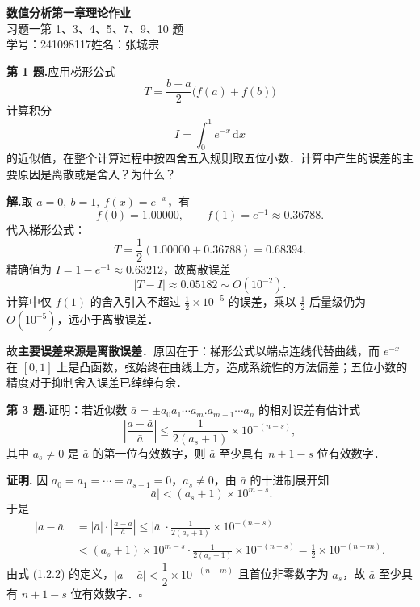\documentclass[UTF8,a4paper,11pt]{ctexart}
\newcommand*{\QED}{\hfill\ensuremath{\square}}
\begin{document}
\begin{center}
  {\LARGE\bfseries 数值分析\quad 第一章理论作业}\\[6pt]
  {\large 习题一\quad 第 1、3、4、5、7、9、10 题}\\[4pt]
  {\normalsize 学号：241098117\quad 姓名：张城宗}
\end{center}

\bigskip

\noindent\textbf{第 1 题.}\quad 应用梯形公式
\[
  T = \frac{b-a}{2}\bigl(f(a)+f(b)\bigr)
\]
计算积分
\[
  I = \int_0^1 e^{-x}\,\mathrm{d}x
\]
的近似值，在整个计算过程中按四舍五入规则取五位小数．计算中产生的误差的主要原因是离散或是舍入？为什么？

\medskip
\noindent\textbf{解.}\quad 取 $a=0,\ b=1,\ f(x)=e^{-x}$，有
\[
  f(0) = 1.00000,\qquad f(1) = e^{-1} \approx 0.36788.
\]
代入梯形公式：
\[
  T = \frac{1}{2}(1.00000 + 0.36788) = 0.68394.
\]
精确值为 $I = 1 - e^{-1} \approx 0.63212$，故离散误差
\[
  |T - I| \approx 0.05182 \sim O(10^{-2}).
\]
计算中仅 $f(1)$ 的舍入引入不超过 $\frac{1}{2}\times 10^{-5}$ 的误差，乘以 $\frac{1}{2}$ 后量级仍为
$O(10^{-5})$，远小于离散误差．

故\textbf{主要误差来源是离散误差}．原因在于：梯形公式以端点连线代替曲线，而
$e^{-x}$ 在 $[0,1]$ 上是凸函数，弦始终在曲线上方，造成系统性的方法偏差；五位小数的精度对于抑制舍入误差已绰绰有余．

\bigskip\bigskip

\noindent\textbf{第 3 题.}\quad 证明：若近似数
$\bar{a} = \pm a_0 a_1\cdots a_m.a_{m+1}\cdots a_n$
的相对误差有估计式
\[
  \left|\frac{a-\bar{a}}{\bar{a}}\right| \leqslant \frac{1}{2(a_s+1)}\times 10^{-(n-s)},
\]
其中 $a_s\neq 0$ 是 $\bar{a}$ 的第一位有效数字，则 $\bar{a}$ 至少具有 $n+1-s$ 位有效数字．

\medskip
\noindent\textbf{证明.}\quad
因 $a_0=a_1=\cdots=a_{s-1}=0$，$a_s\neq 0$，由 $\bar{a}$ 的十进制展开知
\[
  |\bar{a}| < (a_s+1)\times 10^{m-s}.
\]
于是
\begin{align*}
  |a-\bar{a}|
  &= |\bar{a}|\cdot\left|\frac{a-\bar{a}}{\bar{a}}\right|
   \leqslant |\bar{a}|\cdot\frac{1}{2(a_s+1)}\times 10^{-(n-s)}\\
  &< (a_s+1)\times 10^{m-s}\cdot\frac{1}{2(a_s+1)}\times 10^{-(n-s)}
   = \frac{1}{2}\times 10^{-(n-m)}.
\end{align*}
由式 (1.2.2) 的定义，$|a-\bar{a}|<\dfrac{1}{2}\times 10^{-(n-m)}$ 且首位非零数字为 $a_s$，故 $\bar{a}$ 至少具有 $n+1-s$ 位有效数字．\QED
\end{document}
